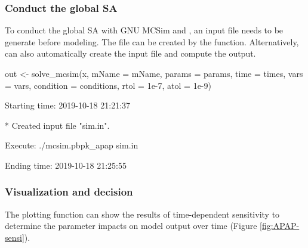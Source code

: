 \hypertarget{conduct-the-global-sa}{%
\subsubsection{Conduct the global SA}\label{conduct-the-global-sa}}

To conduct the global SA with GNU MCSim and , an input
file needs to be generate before modeling. The file can be created by
the  function. Alternatively, 
can also automatically create the input file and compute the output.

\begin{Schunk}
\begin{Sinput}
out <- solve_mcsim(x, mName = mName,
                   params = params, 
                   time = times, 
                   vars = vars,
                   condition = conditions, 
                   rtol = 1e-7, atol = 1e-9)
\end{Sinput}
\begin{Soutput}
  Starting time: 2019-10-18 21:21:37
\end{Soutput}
\begin{Soutput}
  * Created input file "sim.in".
\end{Soutput}
\begin{Soutput}
  Execute: ./mcsim.pbpk_apap sim.in
\end{Soutput}
\begin{Soutput}
  Ending time: 2019-10-18 21:25:55
\end{Soutput}
\end{Schunk}

\hypertarget{visualization-and-decision}{%
\subsubsection{Visualization and
decision}\label{visualization-and-decision}}

The plotting function can show the results of time-dependent sensitivity
to determine the parameter impacts on model output over time (Figure
\ref{fig:APAP-sensi}).

